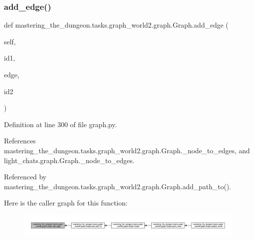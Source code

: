 \subsubsection{\texorpdfstring{add\+\_\+edge()}{add\_edge()}}
{\footnotesize\ttfamily def mastering\+\_\+the\+\_\+dungeon.\+tasks.\+graph\+\_\+world2.\+graph.\+Graph.\+add\+\_\+edge (\begin{DoxyParamCaption}\item[{}]{self,  }\item[{}]{id1,  }\item[{}]{edge,  }\item[{}]{id2 }\end{DoxyParamCaption})}



Definition at line 300 of file graph.\+py.



References mastering\+\_\+the\+\_\+dungeon.\+tasks.\+graph\+\_\+world2.\+graph.\+Graph.\+\_\+node\+\_\+to\+\_\+edges, and light\+\_\+chats.\+graph.\+Graph.\+\_\+node\+\_\+to\+\_\+edges.



Referenced by mastering\+\_\+the\+\_\+dungeon.\+tasks.\+graph\+\_\+world2.\+graph.\+Graph.\+add\+\_\+path\+\_\+to().

Here is the caller graph for this function\+:
\nopagebreak
\begin{figure}[H]
\begin{center}
\leavevmode
\includegraphics[width=350pt]{classmastering__the__dungeon_1_1tasks_1_1graph__world2_1_1graph_1_1Graph_a78dc1fba5fc546807936ce27be6eecf9_icgraph}
\end{center}
\end{figure}
\mbox{\label{classmastering__the__dungeon_1_1tasks_1_1graph__world2_1_1graph_1_1Graph_a506ee7f9d07c8c6b63d59d73d50ffe72}} 
